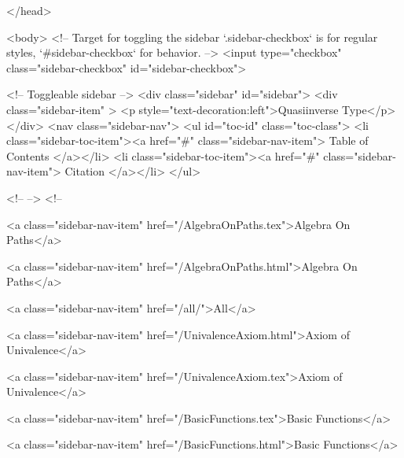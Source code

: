   
</head>




  <body>
    <!-- Target for toggling the sidebar `.sidebar-checkbox` is for regular
     styles, `#sidebar-checkbox` for behavior. -->
<input type="checkbox" class="sidebar-checkbox" id="sidebar-checkbox">

<!-- Toggleable sidebar -->
<div class="sidebar" id="sidebar">
  <div class="sidebar-item" >
    <p style="text-decoration:left">Quasiinverse Type</p>
  </div>
  <nav class="sidebar-nav">
    <ul id="toc-id" class="toc-class">
  <li class="sidebar-toc-item"><a href="#" class="sidebar-nav-item"> Table of Contents </a></li>
  <li class="sidebar-toc-item"><a href="#" class="sidebar-nav-item"> Citation </a></li>
</ul>


    <!--  -->
    <!-- 
      
    
      
    
      
    
      
        
      
    
      
        
          <a class="sidebar-nav-item" href="/AlgebraOnPaths.tex">Algebra On Paths</a>
        
      
    
      
        
          <a class="sidebar-nav-item" href="/AlgebraOnPaths.html">Algebra On Paths</a>
        
      
    
      
        
          <a class="sidebar-nav-item" href="/all/">All</a>
        
      
    
      
        
          <a class="sidebar-nav-item" href="/UnivalenceAxiom.html">Axiom of Univalence</a>
        
      
    
      
        
          <a class="sidebar-nav-item" href="/UnivalenceAxiom.tex">Axiom of Univalence</a>
        
      
    
      
        
          <a class="sidebar-nav-item" href="/BasicFunctions.tex">Basic Functions</a>
        
      
    
      
        
          <a class="sidebar-nav-item" href="/BasicFunctions.html">Basic Functions</a>
        
